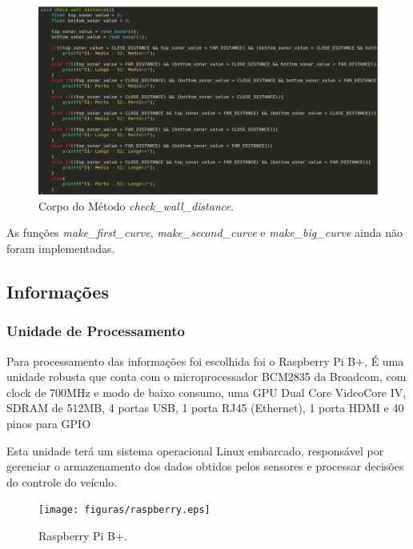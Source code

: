   \begin{figure}[!htbp]
  \begin{center}
  \includegraphics[width=1\textwidth]{figuras/check_wall_distance.eps}
  \caption{\label{fig:check_wall_distance}Corpo do Método \textit{check\_wall\_distance}.}
  \end{center}
  \end{figure}

  As funções \textit{make\_first\_curve}, \textit{make\_second\_curve} e \textit{make\_big\_curve} ainda não
  foram implementadas.

  \subsection{Informações}

  \subsubsection{Unidade de Processamento}

  Para processamento das informações foi
  escolhida foi o Raspberry Pi B+,
  É uma unidade robusta que conta com o microprocessador
  BCM2835 da Broadcom, com clock de
  700MHz e modo de baixo consumo, uma GPU Dual Core VideoCore
  IV\textregistered, SDRAM de 512MB, 4 portas USB, 1 porta RJ45
  (Ethernet), 1 porta HDMI e 40 pinos para GPIO~\cite{raspref}

  Esta unidade terá um sistema operacional Linux embarcado, responsável
  por gerenciar o armazenamento dos dados obtidos pelos sensores e
  processar decisões do controle do veículo.

  \begin{figure}[!htbp]
  \begin{center}
  \texttt{[image: figuras/raspberry.eps]}
  \caption{\label{fig:raspberry}Raspberry Pi B+.}
  \end{center}
  \end{figure}

